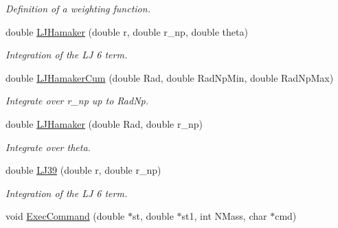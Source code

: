 \begin{DoxyCompactItemize}
\begin{DoxyCompactList}\small\item\em \-Definition of a weighting function. \end{DoxyCompactList}\item 
\hypertarget{classMatematica_aac48860fd7ddec8063e83f2a401d964e}{double \hyperlink{classMatematica_aac48860fd7ddec8063e83f2a401d964e}{\-L\-J\-Hamaker} (double r, double r\-\_\-np, double theta)}\label{classMatematica_aac48860fd7ddec8063e83f2a401d964e}

\begin{DoxyCompactList}\small\item\em \-Integration of the \-L\-J 6 term. \end{DoxyCompactList}\item 
\hypertarget{classMatematica_a51d698727558e19853a9b5b57d408cce}{double \hyperlink{classMatematica_a51d698727558e19853a9b5b57d408cce}{\-L\-J\-Hamaker\-Cum} (double \-Rad, double \-Rad\-Np\-Min, double \-Rad\-Np\-Max)}\label{classMatematica_a51d698727558e19853a9b5b57d408cce}

\begin{DoxyCompactList}\small\item\em \-Integrate over r\-\_\-np up to \-Rad\-Np. \end{DoxyCompactList}\item 
\hypertarget{classMatematica_a1a96fd9eb322682d6239edae5786df00}{double \hyperlink{classMatematica_a1a96fd9eb322682d6239edae5786df00}{\-L\-J\-Hamaker} (double \-Rad, double r\-\_\-np)}\label{classMatematica_a1a96fd9eb322682d6239edae5786df00}

\begin{DoxyCompactList}\small\item\em \-Integrate over theta. \end{DoxyCompactList}\item 
\hypertarget{classMatematica_a1dad46d7d3646dfe812d20dd22e06513}{double \hyperlink{classMatematica_a1dad46d7d3646dfe812d20dd22e06513}{\-L\-J39} (double r, double r\-\_\-np)}\label{classMatematica_a1dad46d7d3646dfe812d20dd22e06513}

\begin{DoxyCompactList}\small\item\em \-Integration of the \-L\-J 6 term. \end{DoxyCompactList}\item 
\hypertarget{classMatematica_ad9ec0b6378fe8077c460449a16404ca7}{void \hyperlink{classMatematica_ad9ec0b6378fe8077c460449a16404ca7}{\-Exec\-Command} (double $\ast$st, double $\ast$st1, int \-N\-Mass, char $\ast$cmd)}\label{classMatematica_ad9ec0b6378fe8077c460449a16404ca7}


\end{DoxyCompactItemize}
